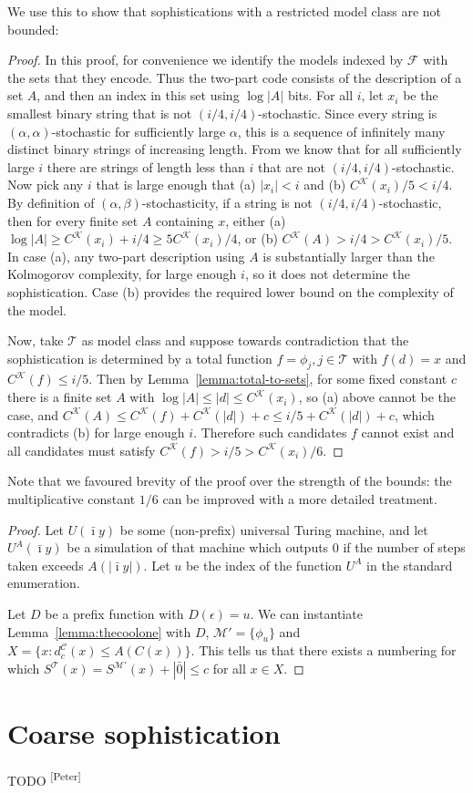 \documentclass{style/llncs}
\newcommand{\M}{\mathscr M}
\newcommand{\C}{\mathscr C}
\newcommand{\T}{\mathscr T}
\newcommand{\F}{\mathscr F}
\newcommand{\K}{\mathscr K}
\newcommand{\s}{S}
\newcommand{\pb}[1]{\textcolor{OliveGreen}{\small #1 \textsuperscript{[Peter]} }}
\begin{document}
We use this to show that sophistications with a restricted model class are not bounded:
\dogfood*
\begin{proof}
In this proof, for convenience we identify the models indexed by $\F$ with the sets that they encode. Thus the two-part code consists of the description of a set $A$, and then an index in this set using $\log|A|$ bits.
For all $i$, let $x_i$ be the smallest binary string that is not $(i/4, i/4)$-stochastic. Since every string is $(\alpha,\alpha)$-stochastic for sufficiently large $\alpha$, this is a sequence of infinitely many distinct binary strings of increasing length. From \cite[Proposition~I.3 (b)]{gacs2001algorithmic} we know that for all sufficiently large $i$ there are strings of length less than $i$ that are not $(i/4, i/4)$-stochastic. Now pick any $i$ that is large enough that (a) $|x_i|<i$ and (b) $C^\K(x_i)/5 < i/4$. By definition of $(\alpha,\beta)$-stochasticity, if a string is not $(i/4,i/4)$-stochastic, then for every finite set $A$ containing $x$, either (a) $\log|A|\ge C^\K(x_i)+i/4\ge 5C^\K(x_i)/4$, or (b) $C^\K(A)>i/4>C^\K(x_i)/5$.
In case (a), any two-part description using $A$ is substantially larger than the Kolmogorov complexity, for large enough $i$, so it does not determine the sophistication. Case (b) provides the required lower bound on the complexity of the model.

Now, take $\T$ as model class and suppose towards contradiction that the sophistication is determined by a total function $f=\phi_j,j\in\T$ with $f(d)=x$ and $C^\K(f)\le i/5$. Then by Lemma~\ref{lemma:total-to-sets}, for some fixed constant $c$ there is a finite set $A$ with $\log|A|\le|d|\le C^\K(x_i)$, so (a) above cannot be the case, and $C^\K(A)\le C^\K(f)+C^\K(|d|)+c\le i/5+C^\K(|d|)+c$, which contradicts (b) for large enough $i$. Therefore such candidates $f$ cannot exist and all candidates must satisfy $C^\K(f)>i/5>C^\K(x_i)/6$.
\end{proof}

Note that we favoured brevity of the proof over the strength of the bounds: the multiplicative constant $1/6$ can be improved with a more detailed treatment.

\depth*
\begin{proof}
Let $U(\bar\imath y)$ be some (non-prefix) universal Turing machine, and let $U^A(\bar\imath y)$ be a simulation of that machine which outputs $0$ if the number of steps taken exceeds $A(|\bar\imath y|)$. Let $u$ be the index of the function $U^A$ in the standard enumeration.

Let $D$ be a prefix function with $D(\epsilon) = u$. We can instantiate Lemma~\ref{lemma:thecoolone} with $D$, $\M' = \{\phi_u\}$ and $X = \{x : d^\C_c(x) \leq A(C(x))\}$. This tells us that there exists a numbering for which $\s^\T(x) = \s^{\M'}(x) + |\bar0| \leq c$ for all $x \in X$.
\end{proof}

\section{Coarse sophistication}

\pb{TODO}
\end{document}
